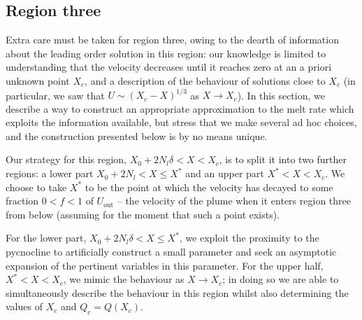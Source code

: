 \documentclass[openacc]{rsproca_new}%
\newcommand{\lt}{\delta} %
\newcommand{\out}{\text{out}}
\begin{document}
\subsection{Region three}\label{S:MeltRate:R3}
Extra care must be taken for region three, owing to the dearth of information about the leading order solution in this region: our knowledge is limited to understanding that the velocity decreases until it reaches zero at an a priori unknown point $X_c$, and a description of the behaviour of solutions close to $X_c$ (in particular, we saw that $U \sim (X_c - X)^{1/3}$ as $X \to X_c$). In this section, we describe a way to construct an appropriate approximation to the melt rate which exploits the information available, but stress that we make several ad hoc choices, and the construction presented below is by no means unique.

Our strategy for this region, $X_0 + 2N_l \lt < X < X_c$, is to split it into two further regions: a lower part $X_0 + 2 N_l < X \leq X^*$ and an upper part $X^* < X < X_c$. We choose to take $X^*$ to be the point at which the velocity has decayed to some fraction $0 < f < 1$ of $U_\out$ -- the velocity of the plume when it enters region three from below (assuming for the moment that such a point exists).

For the lower part, $X_0  + 2N_l \lt < X \leq X^*$, we exploit the proximity to the pycnocline to artificially construct a small parameter and seek an asymptotic expansion of the pertinent variables in this parameter. For the upper half, $X^* < X < X_c$, we mimic the behaviour as $X \to X_c$; in doing so we are able to simultaneously describe the behaviour in this region whilst also determining the values of $X_c$ and $Q_c = Q(X_c)$.
\end{document}
